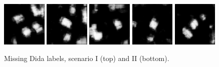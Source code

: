 \documentclass[12pt,a4paper]{article}
\begin{document}
\begin{figure}[p]
        \includegraphics[width=0.19\textwidth]{images/data_withjosm/predictions/535}
        \includegraphics[width=0.19\textwidth]{images/data_withjosm/predictions/537}
        \includegraphics[width=0.19\textwidth]{images/data_withjosm/predictions/539}
        \includegraphics[width=0.19\textwidth]{images/data_withjosm/predictions/551}
        \includegraphics[width=0.19\textwidth]{images/data_withjosm/predictions/553}
        
        \caption{Missing Dida labels, scenario I (top) and II (bottom).}
        \label{f:labels}
    \end{figure}

    
    
\end{document}
